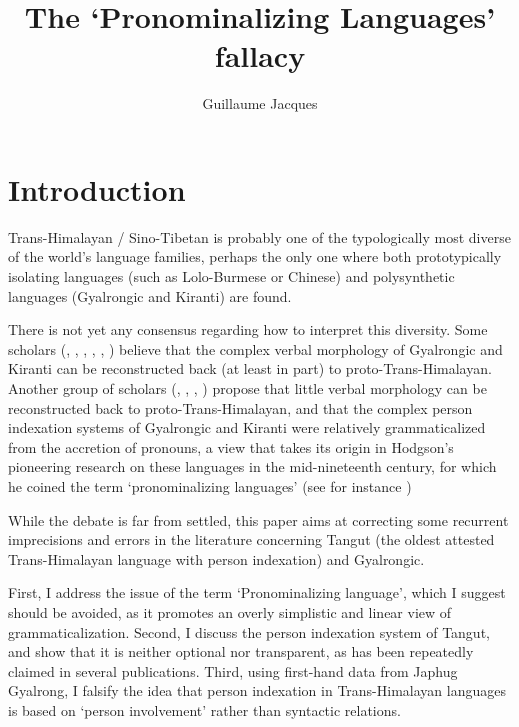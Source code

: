 \documentclass[oldfontcommands,oneside,a4paper,11pt]{article}
\begin{document}
 
\title{The `Pronominalizing Languages' fallacy}
\author{Guillaume Jacques}
\maketitle

\section{Introduction}
Trans-Himalayan / Sino-Tibetan is probably one of the typologically most diverse of the world's language families, perhaps the only one where both prototypically isolating languages (such as Lolo-Burmese or Chinese) and polysynthetic languages (Gyalrongic and Kiranti) are found. 

There is not yet any consensus regarding how to interpret this diversity. Some scholars (\citealt{bauman75}, \citealt{delancey89agreement}, \citealt{driem93agreement}, \citealt{delancey10agreement}, \citealt{delancey11prefixes}, \citealt{jacques12agreement}) believe that the complex verbal morphology of Gyalrongic and Kiranti can be reconstructed back (at least in part) to proto-Trans-Himalayan. Another group of scholars (\citealt{lapolla92},  \citealt{lapolla03}, \citealt{lapolla12comments}, \citealt{zeisler15eat}) propose that little verbal morphology can be reconstructed back to proto-Trans-Himalayan, and that the complex person indexation systems of Gyalrongic and Kiranti were relatively grammaticalized from the accretion of pronouns, a view that takes its origin in Hodgson's pioneering research on these languages in the mid-nineteenth century, for which he coined the term `pronominalizing languages' (see for instance  \citealt{hodgson57sifan})

While the debate is far from settled, this paper aims at correcting some recurrent imprecisions and errors in the literature concerning Tangut (the oldest attested Trans-Himalayan language with person indexation) and Gyalrongic. 

First, I address the issue of the term `Pronominalizing language', which I suggest should be avoided, as it promotes an overly simplistic and linear view of grammaticalization. Second, I discuss the person indexation system of Tangut, and show that it is neither optional nor transparent, as has been repeatedly claimed in several publications. Third,  using first-hand data from Japhug Gyalrong, I falsify the idea that person indexation in Trans-Himalayan languages is based on `person involvement' rather than syntactic relations.
\end{document}
